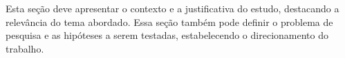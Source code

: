 Esta seção deve apresentar o contexto e a justificativa do estudo, destacando
a relevância do tema abordado. Essa seção também pode definir o problema de
pesquisa e as hipóteses a serem testadas, estabelecendo o direcionamento do
trabalho.
